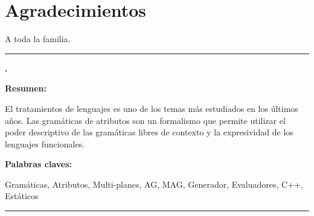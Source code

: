 \documentclass[a4paper,11pt,twoside]{ThesisStyle}
\begin{document}


\dominitoc


\cleardoublepage

\section*{Agradecimientos}

A toda la familia.

\tableofcontents

\mainmatter

% 
\appendix



% 
% 




\cleardoublepage

\begin{vcenterpage}

\noindent\rule[2pt]{\textwidth}{0.5pt}

{\centering\large\textbf{\maggen.\\}}

{\large\textbf{Resumen:}}

El tratamientos de lenguajes es uno de los temas más estudiados en los últimos años.
Las gramáticas de atributos son un formalismo que permite utilizar el poder descriptivo de las gramáticas libres de contexto y la expresividad de los lenguajes funcionales. 

{\large\textbf{Palabras claves:}}

Gramáticas, Atributos, Multi-planes, AG, MAG, Generador, Evaluadores, C++, Estáticos\\

\noindent\rule[2pt]{\textwidth}{0.5pt}

\end{vcenterpage}
\end{document}
